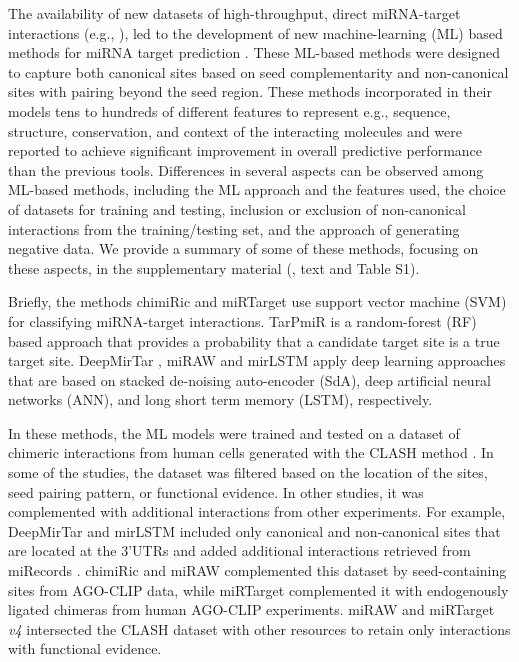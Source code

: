 \documentclass{bmcart}
\begin{document}
The availability of new datasets of high-throughput, direct miRNA-target interactions (e.g., \cite{scheel2017global, grosswendt2014unambiguous, darnell_moore2015mirna, helwak2013mapping}), led to the development of new machine-learning (ML) based methods for miRNA target prediction \cite{lu2016learning, ding2016tarpmir, pla2018miraw, wen2018deepmirtar, cheng2015mirtdl, menor2014mirmark}. These ML-based methods were designed to capture both canonical sites based on seed complementarity and non-canonical sites with pairing beyond the seed region. These methods incorporated in their models tens to hundreds of different features to represent e.g., sequence, structure, conservation, and context of the interacting molecules and were reported to achieve significant improvement in overall predictive performance than the previous tools. Differences in several aspects can be observed among ML-based methods, including the ML approach and the features used, the choice of datasets for training and testing, inclusion or exclusion of non-canonical interactions from the training/testing set, and the approach of generating negative data. We provide a summary of some of these methods, focusing on these aspects, in the supplementary material (, text and Table S1). 

Briefly, the methods chimiRic \cite{lu2016learning} and miRTarget \cite{wang2016improving,liu2019prediction} use support vector machine (SVM) for classifying miRNA-target interactions. TarPmiR \cite{ding2016tarpmir} is a random-forest (RF) based approach that provides a probability that a candidate target site is a true target site. DeepMirTar \cite{wen2018deepmirtar}, miRAW \cite{pla2018miraw}  and mirLSTM \cite{paker2019mirlstm} apply deep learning approaches that are based on stacked de-noising auto-encoder (SdA), deep artificial neural networks (ANN), and long short term memory (LSTM), respectively.  

In these methods, the ML models were trained and tested on a dataset of chimeric interactions from human cells generated with the CLASH method \cite{helwak2013mapping}. In some of the studies, the dataset was filtered based on the location of the sites, seed pairing pattern, or functional evidence. In other studies, it was complemented with additional interactions from other experiments. For example, DeepMirTar \cite{wen2018deepmirtar} and mirLSTM \cite{paker2019mirlstm} included only canonical and non-canonical sites that are located at the 3'UTRs and added additional interactions retrieved from miRecords \cite{xiao2009mirecords}. 
chimiRic \cite{lu2016learning} and miRAW \cite{pla2018miraw} complemented this dataset by seed-containing sites from AGO-CLIP data, while miRTarget \cite{wang2016improving} complemented it with endogenously ligated chimeras from human AGO-CLIP experiments. miRAW \cite{pla2018miraw} and miRTarget \textit{v4} \cite{liu2019prediction} intersected the CLASH dataset with other resources to retain only interactions with functional evidence.
\end{document}
